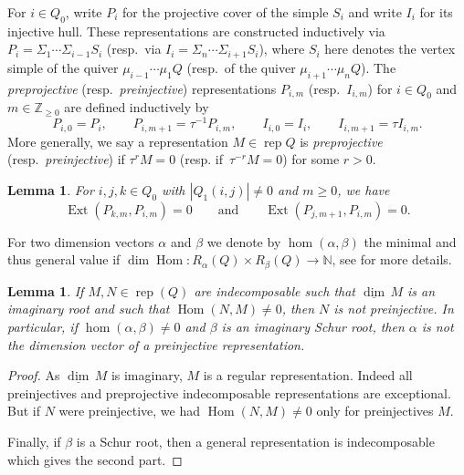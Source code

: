 \documentclass{amsart}
\newtheorem{lemma}[theorem]{Lemma}
\numberwithin{equation}{section}
\newcommand{\NN}{\mathbb{N}}
\newcommand{\ZZ}{\mathbb{Z}}
\newcommand\udim{{\underline{\dim}\, }}
\newcommand{\Ext}{\operatorname{Ext}}
\newcommand{\Hom}{\operatorname{Hom}}
\newcommand{\Irr}{\operatorname{Irr}}
\newcommand{\rep}{\operatorname{rep}}
\begin{document}
For $i\in Q_0$, write $P_i$ for the projective cover of the simple $S_i$ and write $I_i$ for its injective hull.
These representations are constructed inductively via $P_i=\Sigma_1\cdots\Sigma_{i-1}S_i$ (resp.~via $I_i=\Sigma_n\cdots\Sigma_{i+1}S_i$), where $S_i$ here denotes the vertex simple of the quiver $\mu_{i-1}\cdots\mu_1 Q$ (resp.~of the quiver $\mu_{i+1}\cdots\mu_n Q$).
The \emph{preprojective} (resp.~\emph{preinjective}) representations $P_{i,m}$ (resp.~$I_{i,m}$) for $i\in Q_0$ and $m\in\ZZ_{\ge0}$ are defined inductively by
\[P_{i,0}=P_i,\qquad P_{i,m+1}=\tau^{-1} P_{i,m},\qquad I_{i,0}=I_i,\qquad I_{i,m+1}=\tau I_{i,m}.\]
More generally, we say a representation $M\in\rep Q$ is \emph{preprojective} (resp.~\emph{preinjective}) if $\tau^r M=0$ (resp. if~$\tau^{-r} M=0$) for some $r>0$.

\begin{lemma}
  \label{le:preprojective ext groups}
  For $i,j,k\in Q_0$ with $|Q_1(i,j)|\ne0$ and $m\ge0$, we have 
  \[\Ext(P_{k,m},P_{i,m})=0 \qquad \text{and} \qquad \Ext(P_{j,m+1},P_{i,m})=0.\]
\end{lemma}
For two dimension vectors $\alpha$ and $\beta$ we denote by $\hom(\alpha,\beta)$ the minimal and thus general value if $\dim\Hom:R_\alpha(Q)\times R_\beta(Q)\to \NN$, see \cite{sch} for more details.
\begin{lemma}
  \label{lem: non-preinjective}
  If $M,N\in\rep(Q)$ are indecomposable such that $\udim M$ is an imaginary root and such that $\Hom(N,M)\neq 0$, then $N$ is not preinjective.
  In particular, if $\hom(\alpha,\beta)\neq 0$ and $\beta$ is an imaginary Schur root, then $\alpha$ is not the dimension vector of a preinjective representation.
\end{lemma}
\begin{proof}
  As $\udim M$ is imaginary, $M$ is a regular representation.
  Indeed all preinjectives and preprojective indecomposable representations are exceptional.
  But if $N$ were preinjective, we had $\Hom(N,M)\neq 0$ only for preinjectives $M$.

  Finally, if $\beta$ is a Schur root, then a general representation is indecomposable which gives the second part.
\end{proof}
\end{document}
